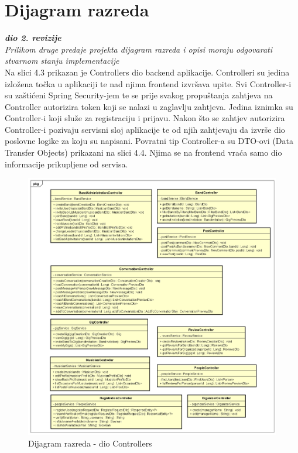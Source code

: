 		\section{Dijagram razreda}


			\textit{\textbf{dio 2. revizije}} \\
			
			\textit{Prilikom druge predaje projekta dijagram razreda i opisi moraju odgovarati stvarnom stanju implementacije} \\
			
			
			Na slici 4.3 prikazan je Controllers dio backend aplikacije. Controlleri su jedina izložena točka u aplikaciji te nad njima frontend izvršava upite. Svi Controller-i su zaštićeni Spring Security-jem te se prije svakog propuštanja zahtjeva na Controller autorizira token koji se nalazi u zaglavlju zahtjeva. Jedina iznimka su Controller-i koji služe za registraciju i prijavu. Nakon što se zahtjev autorizira Controller-i pozivaju servisni sloj aplikacije te od njih zahtjevaju da izvrše dio poslovne logike za koju su napisani. Povratni tip Controller-a su DTO-ovi (Data Transfer Objects) prikazani na slici 4.4. Njima se na frontend vraća samo dio informacije prikupljene od servisa.  

			\begin{figure}[H]
				\begin{center}
					\includegraphics[width=17cm]{slike/kontroleri.PNG}
				\end{center}
				\caption{Dijagram razreda - dio Controllers}
				\label{fig:kontroleri}
			\end{figure}
		
